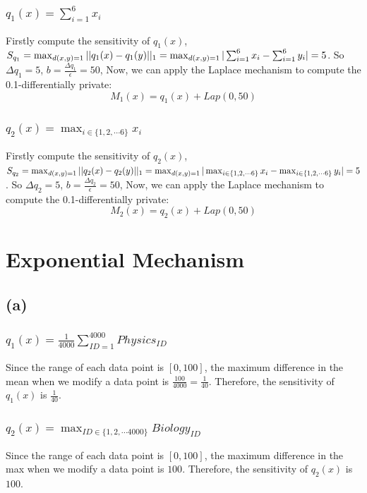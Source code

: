 \documentclass[a4paper,12pt]{article}
\begin{document}
\subsubsection{$q_1(x) = \sum_{i=1}^{6}x_i$}
Firstly compute the sensitivity of $q_1(x)$, $S_{q_1} = \max_{d(x,y) = 1}||q_1(x) - q_1(y)||_1
    \newline
    = \max_{d(x,y) = 1}|\sum_{i=1}^{6}x_i - \sum_{i=1}^{6}y_i| = 5$. So $\Delta q_1 = 5$, $b = \frac{\Delta q_1}{\epsilon} = 50$, Now, we can apply the Laplace mechanism to compute the 0.1-differentially private:
\begin{equation}
    M_1(x) = q_1(x) + Lap(0, 50)
\end{equation}

\subsubsection{$q_2(x) = \max_{i\in \{1,2,\cdots 6\}}x_i$}
Firstly compute the sensitivity of $q_2(x)$, $S_{q_2} = \max_{d(x,y) = 1}||q_2(x) - q_2(y)||_1
    \newline
    = \max_{d(x,y) = 1}|\max_{i\in \{1,2,\cdots 6\}}x_i - \max_{i\in \{1,2,\cdots 6\}}y_i| = 5$. So $\Delta q_2 = 5$, $b = \frac{\Delta q_2}{\epsilon} = 50$, Now, we can apply the Laplace mechanism to compute the 0.1-differentially private:
\begin{equation}
    M_2(x) = q_2(x) + Lap(0, 50)
\end{equation}

\section{Exponential Mechanism}
\subsection{(a)}
\subsubsection{$q_1(x) = \frac{1}{4000}\sum_{ID=1}^{4000}Physics_{ID}$}
Since the range of each data point is $[0, 100]$, the maximum difference in the mean
when we modify a data point is $\frac{100}{4000} = \frac{1}{40}$.
Therefore, the sensitivity of $q_1(x)$ is $\frac{1}{40}$.
\subsubsection{$q_2(x) = \max_{ID\in \{1,2,\cdots 4000\}}Biology_{ID}$}
Since the range of each data point is $[0, 100]$, the maximum difference in the max
when we modify a data point is $100$.
Therefore, the sensitivity of $q_2(x)$ is $100$.
\end{document}
